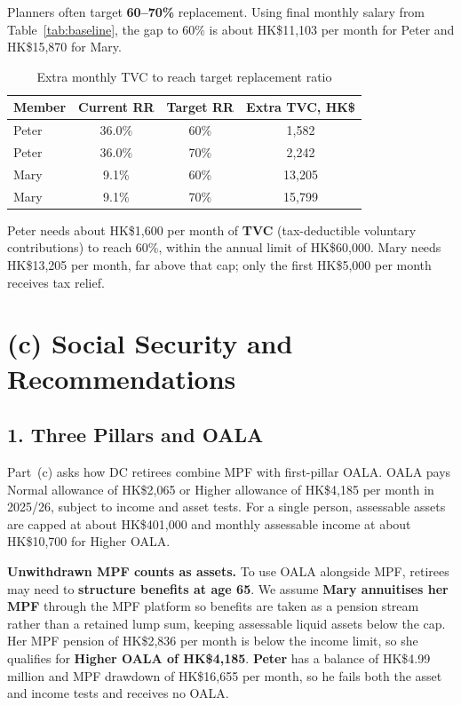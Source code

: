 \documentclass[12pt, letterpaper]{article}
\begin{document}
Planners often target \textbf{60--70\%} replacement. Using final monthly salary from Table~\ref{tab:baseline}, the gap to 60\% is about HK\$11,103 per month for Peter and HK\$15,870 for Mary.

\begin{table}[H]
  \centering
  \caption{Extra monthly TVC to reach target replacement ratio}
  \label{tab:tvc}
  \small
  \begin{tabular}{@{}lccc@{}}
    \toprule
    Member & Current RR & Target RR & Extra TVC, HK\$ \\
    \midrule
    Peter & 36.0\% & 60\% & 1,582 \\
    Peter & 36.0\% & 70\% & 2,242 \\
    Mary & 9.1\% & 60\% & 13,205 \\
    Mary & 9.1\% & 70\% & 15,799 \\
    \bottomrule
  \end{tabular}
\end{table}

Peter needs about HK\$1,600 per month of \textbf{TVC} (tax-deductible voluntary contributions) to reach 60\%, within the annual limit of HK\$60,000. Mary needs HK\$13,205 per month, far above that cap; only the first HK\$5,000 per month receives tax relief.

\section*{(c) Social Security and Recommendations}

\subsection*{1. Three Pillars and OALA}

Part~(c) asks how DC retirees combine MPF with first-pillar OALA. OALA pays Normal allowance of HK\$2,065 or Higher allowance of HK\$4,185 per month in 2025/26, subject to income and asset tests. For a single person, assessable assets are capped at about HK\$401,000 and monthly assessable income at about HK\$10,700 for Higher OALA.

\textbf{Unwithdrawn MPF counts as assets.} To use OALA alongside MPF, retirees may need to \textbf{structure benefits at age 65}. We assume \textbf{Mary annuitises her MPF} through the MPF platform so benefits are taken as a pension stream rather than a retained lump sum, keeping assessable liquid assets below the cap. Her MPF pension of HK\$2,836 per month is below the income limit, so she qualifies for \textbf{Higher OALA of HK\$4,185}. \textbf{Peter} has a balance of HK\$4.99 million and MPF drawdown of HK\$16,655 per month, so he fails both the asset and income tests and receives no OALA.
\end{document}
